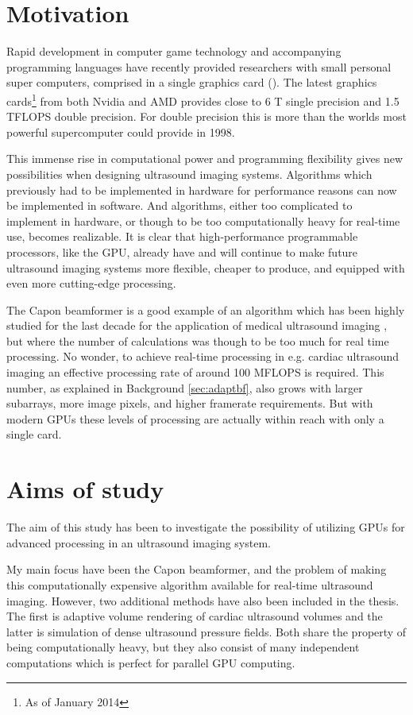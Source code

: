 \section{Motivation}
Rapid development in computer game technology and accompanying programming languages have recently provided researchers with small personal super computers, comprised in a single graphics card (). The latest graphics cards\footnote{As of January 2014} from both Nvidia and AMD provides close to 6 T single precision and 1.5 TFLOPS double precision. For double precision this is more than the worlds most powerful supercomputer could provide in 1998.

This immense rise in computational power and programming flexibility gives new possibilities when designing ultrasound imaging systems. Algorithms which previously had to be implemented in hardware for performance reasons can now be implemented in software. And algorithms, either too complicated to implement in hardware, or though to be too computationally heavy for real-time use, becomes realizable. It is clear that high-performance programmable processors, like the GPU, already have and will continue to make future ultrasound imaging systems more flexible, cheaper to produce, and equipped with even more cutting-edge processing.

The Capon beamformer is a good example of an algorithm which has been highly studied for the last decade for the application of medical ultrasound imaging , but where the number of calculations was though to be too much for real time processing. No wonder, to achieve real-time processing in e.g. cardiac ultrasound imaging an effective processing rate of around 100 MFLOPS is required. This number, as explained in Background \ref{sec:adaptbf}, also grows with larger subarrays, more image pixels, and higher framerate requirements.  But with modern GPUs these levels of processing are actually within reach with only a single card.

\section{Aims of study}
The aim of this study has been to investigate the possibility of utilizing GPUs for advanced processing in an ultrasound imaging system. 

My main focus have been the Capon beamformer, and the problem of making this computationally expensive algorithm available for real-time ultrasound imaging. However, two additional methods have also been included in the thesis. The first is adaptive volume rendering of cardiac ultrasound volumes and the latter is simulation of dense ultrasound pressure fields. Both share the property of being computationally heavy, but they also consist of many independent computations which is perfect for parallel GPU computing. 

